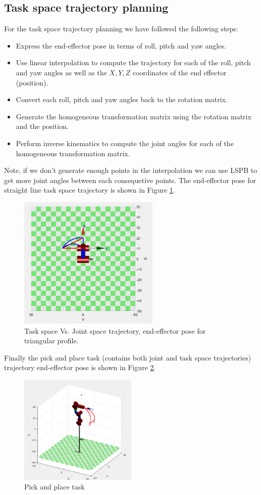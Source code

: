 \subsection{Task space trajectory planning}
For the task space trajectory planning we have followed the following steps:
\begin{itemize}
    \item Express the end-effector pose in terms of roll, pitch and yaw angles.
    \item Use linear interpolation to compute the trajectory for each of the roll, pitch and yaw angles 
          as well as the $X, Y, Z$ coordinates of the end effector (position).
    \item Convert each roll, pitch and yaw angles back to the rotation matrix.
    \item Generate the homogeneous transformation matrix using the rotation matrix and the position.
    \item Perform inverse kinematics to compute the joint angles for each of the homogeneous transformation matrix.
\end{itemize}
Note, if we don't generate enough points in the interpolation we can use LSPB to get more joint angles between each 
consequetive points.
The end-effector pose for straight line task space trajectory is shown in Figure \ref{fig:task_space_trajectory}.
\begin{figure}[H]
    \centering
    \includegraphics[width=0.6\textwidth, height=0.4\textheight]{images/task_space_trajectory.png}
    \caption{Task space Vs. Joint space trajectory, end-effector pose for triangular profile.}
    \label{fig:task_space_trajectory}
\end{figure}
Finally the pick and place task (contains both joint and task space trajectories) trajectory end-effector pose is shown in Figure \ref{fig:pick_and_place}.
\begin{figure}[H]
    \centering
    \includegraphics[width=0.5\textwidth]{images/pick_and_place_trajectory.png}
    \caption{Pick and place task}
    \label{fig:pick_and_place}
\end{figure}

